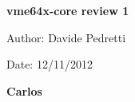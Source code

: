 \documentclass[a4paper,11pt]{article}
\begin{document}
\begin{titlepage}

\begin{center}
\huge{\textbf{vme64x-core review 1}}\\
\end{center}
\vspace{17cm}
\begin{flushleft}
Author: Davide Pedretti
\end{flushleft}
\vspace{1cm}
\begin{flushright}
Date: 12/11/2012
\end{flushright}
\end{titlepage}
\newpage 

\begin{center}
\LARGE{\textbf{Carlos}}
\end{center}
\end{document}
